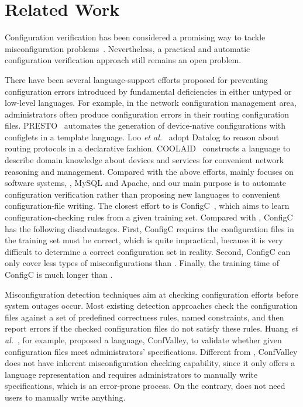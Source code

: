 
\section{Related Work}

Configuration verification has been considered a promising way  
to tackle misconfiguration problems~\cite{xu15systems}.
Nevertheless, a practical and automatic configuration
verification approach still remains an open problem.

There have been several language-support efforts proposed for preventing
configuration errors introduced by fundamental deficiencies in
either untyped or low-level languages. For example, in the network
configuration management area, administrators often
produce configuration errors in their routing configuration files.
PRESTO~\cite{enck07configuration} 
automates the generation of device-native configurations
with configlets in a template language. 
Loo {\em et al.}~\cite{loo05declarative} adopt Datalog to reason about 
routing protocols in a declarative fashion. 
COOLAID~\cite{chen10declarative} constructs
a language to describe domain knowledge about devices and
services for convenient network reasoning and management.
Compared with the above efforts, \app mainly focuses on software systems, 
\eg, MySQL and Apache, and our main purpose is to automate configuration
verification rather than proposing new languages 
to convenient configuration-file writing. 
The closest effort to \app is ConfigC~\cite{santolucitoCAV},
which aims to learn configuration-checking rules from a given training
set. Compared with \app, ConfigC has the following disadvantages.
First, ConfigC requires the configuration files in the training set must 
be correct, which is quite impractical, because it is very difficult to
determine a correct configuration set in reality.
Second, ConfigC can only cover less types of misconfigurations than \app. 
Finally, the training time of ConfigC is much longer than \app.

Misconfiguration detection techniques aim at checking configuration
efforts before system outages occur.
Most existing detection approaches check 
the configuration files against a set of predefined correctness 
rules, named constraints, and then report errors if 
the checked configuration files do not satisfy these rules.
Huang {\em et al.}~\cite{huang15confvalley},
for example, proposed a 
language, ConfValley, to validate 
whether given configuration files meet administrators' specifications. 
Different from \app, ConfValley does not
have inherent misconfiguration checking capability, since it only offers
a language representation and requires administrators to
manually write specifications, which is an error-prone
process. On the contrary, \app does not need users to manually
write anything.

